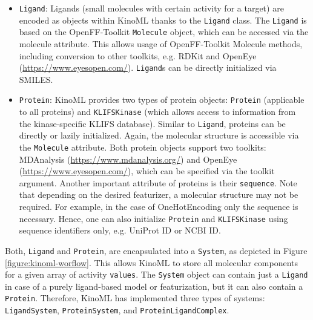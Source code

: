 \documentclass[9pt,lessons]{livecoms}
\begin{document}
\begin{itemize}
    \item \texttt{Ligand}: Ligands (small molecules with certain activity for a target) are encoded as objects within KinoML thanks to the \texttt{Ligand} class. The \texttt{Ligand} is based on the OpenFF-Toolkit \cite{boothroyd2023development} \texttt{Molecule} object, which can be accessed via the molecule attribute. This allows usage of OpenFF-Toolkit Molecule methods, including conversion to other toolkits, e.g. RDKit \cite{landrum2013rdkit} and OpenEye (\url{https://www.eyesopen.com/}). \texttt{Ligand}s can be directly initialized via SMILES. %
    \item \texttt{Protein}: KinoML provides two types of protein objects: \texttt{Protein} (applicable to all proteins) and \texttt{KLIFS\-Kinase} (which allows access to information from the kinase-specific KLIFS database). Similar to \texttt{Ligand}, proteins can be directly or lazily initialized. Again, the molecular structure is accessible via the \texttt{Molecule} attribute. Both protein objects support two toolkits: MDAnalysis (\url{https://www.mdanalysis.org/}) and OpenEye (\url{https://www.eyesopen.com/}), which can be specified via the toolkit argument.  Another important attribute of proteins is their \texttt{sequence}. Note that depending on the desired featurizer, a molecular structure may not be required. For example, in the case of OneHotEncoding only the sequence is necessary. Hence, one can also initialize \texttt{Protein} and \texttt{KLIFSKinase} using sequence identifiers only, e.g. UniProt ID or NCBI ID. 
\end{itemize}
    
Both, \texttt{Ligand} and \texttt{Protein},  are encapsulated into a \texttt{System}, as depicted in Figure \ref{figure:kinoml-worflow}. This allows KinoML to store all molecular components for a given array of activity \texttt{values}. The \texttt{System} object can contain just a \texttt{Ligand} in case of a purely ligand-based model or featurization, but it can also contain a \texttt{Protein}. Therefore, KinoML has implemented three types of systems: \texttt{LigandSystem}, \texttt{ProteinSystem}, and \texttt{ProteinLigandComplex}.
\end{document}

